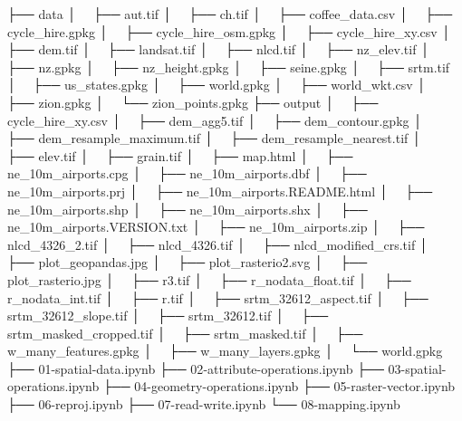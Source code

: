 \documentclass[
  letterpaper,
]{krantz}
\newenvironment{Shaded}{\begin{snugshade}}{\end{snugshade}}
\newcommand{\NormalTok}[1]{\textcolor[rgb]{0.00,0.23,0.31}{#1}}
\begin{document}
\begin{Shaded}
\begin{Highlighting}[]
\NormalTok{├── data}
\NormalTok{│   ├── aut.tif}
\NormalTok{│   ├── ch.tif}
\NormalTok{│   ├── coffee\_data.csv}
\NormalTok{│   ├── cycle\_hire.gpkg}
\NormalTok{│   ├── cycle\_hire\_osm.gpkg}
\NormalTok{│   ├── cycle\_hire\_xy.csv}
\NormalTok{│   ├── dem.tif}
\NormalTok{│   ├── landsat.tif}
\NormalTok{│   ├── nlcd.tif}
\NormalTok{│   ├── nz\_elev.tif}
\NormalTok{│   ├── nz.gpkg}
\NormalTok{│   ├── nz\_height.gpkg}
\NormalTok{│   ├── seine.gpkg}
\NormalTok{│   ├── srtm.tif}
\NormalTok{│   ├── us\_states.gpkg}
\NormalTok{│   ├── world.gpkg}
\NormalTok{│   ├── world\_wkt.csv}
\NormalTok{│   ├── zion.gpkg}
\NormalTok{│   └── zion\_points.gpkg}
\NormalTok{├── output}
\NormalTok{│   ├── cycle\_hire\_xy.csv}
\NormalTok{│   ├── dem\_agg5.tif}
\NormalTok{│   ├── dem\_contour.gpkg}
\NormalTok{│   ├── dem\_resample\_maximum.tif}
\NormalTok{│   ├── dem\_resample\_nearest.tif}
\NormalTok{│   ├── elev.tif}
\NormalTok{│   ├── grain.tif}
\NormalTok{│   ├── map.html}
\NormalTok{│   ├── ne\_10m\_airports.cpg}
\NormalTok{│   ├── ne\_10m\_airports.dbf}
\NormalTok{│   ├── ne\_10m\_airports.prj}
\NormalTok{│   ├── ne\_10m\_airports.README.html}
\NormalTok{│   ├── ne\_10m\_airports.shp}
\NormalTok{│   ├── ne\_10m\_airports.shx}
\NormalTok{│   ├── ne\_10m\_airports.VERSION.txt}
\NormalTok{│   ├── ne\_10m\_airports.zip}
\NormalTok{│   ├── nlcd\_4326\_2.tif}
\NormalTok{│   ├── nlcd\_4326.tif}
\NormalTok{│   ├── nlcd\_modified\_crs.tif}
\NormalTok{│   ├── plot\_geopandas.jpg}
\NormalTok{│   ├── plot\_rasterio2.svg}
\NormalTok{│   ├── plot\_rasterio.jpg}
\NormalTok{│   ├── r3.tif}
\NormalTok{│   ├── r\_nodata\_float.tif}
\NormalTok{│   ├── r\_nodata\_int.tif}
\NormalTok{│   ├── r.tif}
\NormalTok{│   ├── srtm\_32612\_aspect.tif}
\NormalTok{│   ├── srtm\_32612\_slope.tif}
\NormalTok{│   ├── srtm\_32612.tif}
\NormalTok{│   ├── srtm\_masked\_cropped.tif}
\NormalTok{│   ├── srtm\_masked.tif}
\NormalTok{│   ├── w\_many\_features.gpkg}
\NormalTok{│   ├── w\_many\_layers.gpkg}
\NormalTok{│   └── world.gpkg}
\NormalTok{├── 01{-}spatial{-}data.ipynb}
\NormalTok{├── 02{-}attribute{-}operations.ipynb}
\NormalTok{├── 03{-}spatial{-}operations.ipynb}
\NormalTok{├── 04{-}geometry{-}operations.ipynb}
\NormalTok{├── 05{-}raster{-}vector.ipynb}
\NormalTok{├── 06{-}reproj.ipynb}
\NormalTok{├── 07{-}read{-}write.ipynb}
\NormalTok{└── 08{-}mapping.ipynb}
\end{Highlighting}
\end{Shaded}
\end{document}
